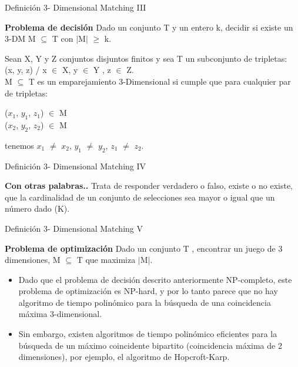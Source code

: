 \documentclass[10pt, mathserif, profesionalfont]{beamer}
\begin{document}
	
	\begin{frame}{Definición 3- Dimensional Matching III}
		\begin{block}{\textbf{Problema de decisión}}		
			Dado un conjunto T y un entero k, decidir si existe un 3-DM M $\subseteq$ T con $\mid$M$\mid$ $\geq$ k.
		\end{block}
		\begin{block}{}
			Sean X, Y y Z conjuntos disjuntos finitos y sea T un subconjunto de tripletas: 
			\\ (x, y, z) /  x $\in$ X, y $\in$ Y , z $\in$ Z. 
			\\ M $\subseteq$ T  es un emparejamiento 3-Dimensional si cumple que para cualquier par de tripletas:
			\begin{center}
				($x_1$, $y_1$, $z_1$) $\in$ M 
				\\($x_2$, $y_2$, $z_2$) $\in$ M
			\end{center}
			tenemos  $x_1$ $\neq$ $x_2$, $y_1$ $\neq$ $y_2$, $z_1$ $\neq$ $z_2$.
		\end{block}
	\end{frame}		
	
	
	\begin{frame}{Definición 3- Dimensional Matching IV}
		\begin{block}{\textbf{Con otras palabras..}}
			Trata de responder verdadero o falso, existe o no existe, que la cardinalidad de un conjunto de selecciones sea mayor o igual que un número dado (K).
		\end{block}
	\end{frame}
	
	
	\begin{frame}{Definición 3- Dimensional Matching V}
		\begin{block}{\textbf{Problema de optimización}}
			Dado un conjunto T , encontrar un juego de 3 dimensiones, M $\subseteq$ T que maximiza $\mid$M$\mid$.
		\end{block}	
		
		\begin{block}{}
			\begin{itemize}
				\item Dado que el problema de decisión descrito anteriormente NP-completo, este problema de optimización es NP-hard, y por lo tanto parece que no hay algoritmo de tiempo polinómico para la búsqueda de una coincidencia máxima 3-dimensional. 
				\item Sin embargo, existen algoritmos de tiempo polinómico eficientes para la búsqueda de un máximo coincidente bipartito (coincidencia máxima de 2 dimensiones), por ejemplo, el algoritmo de Hopcroft-Karp.
			\end{itemize}
		\end{block}
	\end{frame}
	
\end{document}

